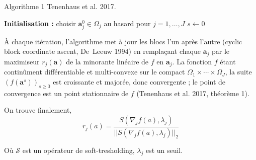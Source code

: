 \documentclass[a4paper,11pt]{paper}
\theoremstyle{plain}
\theoremstyle{definition}
\theoremstyle{remark}
\begin{document}
Algorithme 1 Tenenhaus et al. 2017.


\begin{algorithm}[H]
    \caption{Block relaxation pour le problème (1)}
    \label{alg:rgcca}

    \textbf{Initialisation :} choisir $\mathbf{a}_j^{0} \in \Omega_j$ au hasard
    pour $j = 1, \dots, J$\;
    $s \leftarrow 0$\;

\end{algorithm}

À chaque itération, l'algorithme met à jour les blocs l'un après l'autre (cyclic block coordinate ascent, De~Leeuw 1994) en remplaçant chaque $\mathbf{a}_j$ par le maximiseur $r_j(\mathbf{a})$ de la minorante linéaire de $f$ en $\mathbf{a}_j$. La fonction $f$ étant continûment différentiable et multi-convexe sur le compact $\Omega_1 \times \cdots \times \Omega_J$,
la suite $(f(\mathbf{a}^s))_{s \geqslant 0}$ est croissante et majorée, donc convergente ; le point de convergence est un point stationnaire de $f$ (Tenenhaus et al. 2017, théorème 1).



On trouve finalement,
$$r_j(a) = \dfrac{S(\nabla_j f(a), \lambda_j)}{||S(\nabla_jf(a), \lambda_j)||_2}$$

Où $\mathcal S$ est un opérateur de soft-tresholding, $\lambda_j$ est un seuil.
\end{document}
